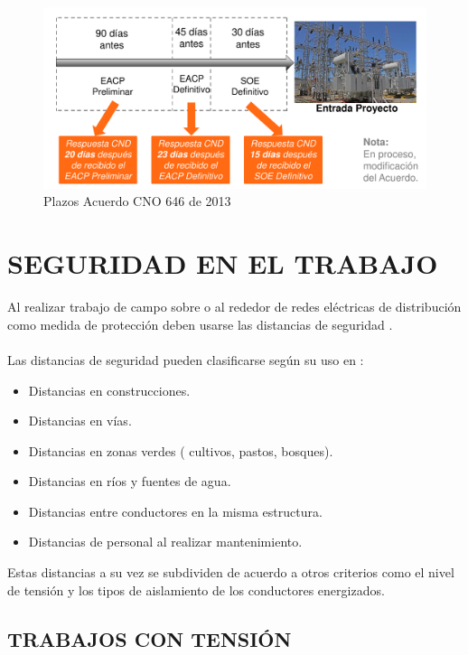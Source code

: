 \documentclass[a5paper]{book}%
\begin{document}
    \begin{figure}[H]
      \caption{Plazos Acuerdo CNO 646 de 2013}
      \label{fig:plazo646}
      \includegraphics[width=\linewidth]{plazo_cno}
      \end{figure}


\chapter{SEGURIDAD EN EL TRABAJO}
Al realizar trabajo de campo sobre o al rededor de redes eléctricas de distribución como medida de protección deben usarse las distancias de seguridad \cite{RETIE2013}.\\\\

Las distancias de seguridad pueden clasificarse según su uso en :

\begin{itemize}
\item Distancias en construcciones.
\item Distancias en vías.
\item Distancias en zonas verdes ( cultivos, pastos, bosques).
\item Distancias en ríos y fuentes de agua.
\item Distancias entre conductores en la misma estructura.
\item Distancias de personal al realizar mantenimiento.
\end{itemize}

Estas distancias a su vez se subdividen de acuerdo a otros criterios como el nivel de tensión y los tipos de aislamiento de los conductores energizados.

\section{TRABAJOS CON TENSIÓN}
\end{document}
